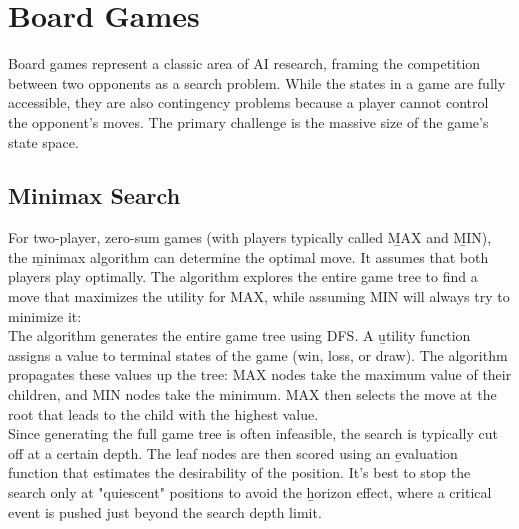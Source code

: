 \section{Board Games}
Board games represent a classic area of AI research, framing the competition between two opponents as a search problem. While the states in a game are fully accessible, they are also contingency problems because a player cannot control the opponent's moves. The primary challenge is the massive size of the game's state space.


\subsection{Minimax Search}
For two-player, zero-sum games (with players typically called \b{MAX} and \b{MIN}), the \b{minimax algorithm} can determine the optimal move. It assumes that both players play optimally. The algorithm explores the entire game tree to find a move that maximizes the utility for MAX, while assuming MIN will always try to minimize it:\\
The algorithm generates the entire game tree using DFS. A \b{utility function} assigns a value to terminal states of the game (win, loss, or draw). The algorithm propagates these values up the tree: MAX nodes take the maximum value of their children, and MIN nodes take the minimum. MAX then selects the move at the root that leads to the child with the highest value.\\

Since generating the full game tree is often infeasible, the search is typically cut off at a certain depth. The leaf nodes are then scored using an \b{evaluation function} that estimates the desirability of the position. It's best to stop the search only at "quiescent" positions to avoid the \b{horizon effect}, where a critical event is pushed just beyond the search depth limit.

